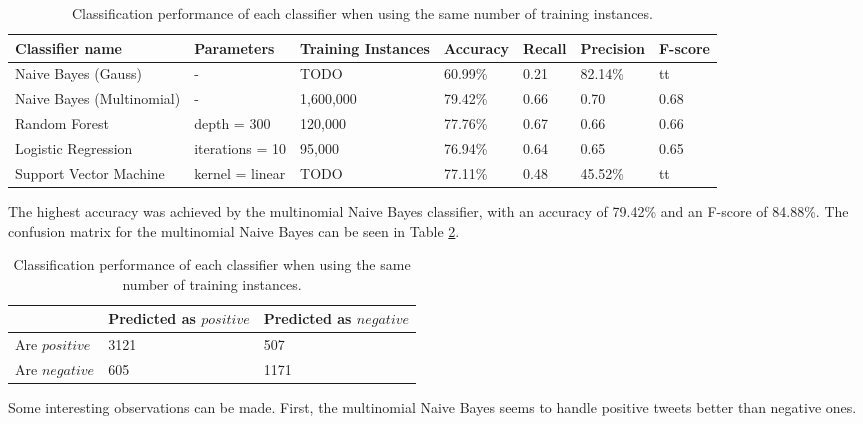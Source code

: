 \begin{table}[]
\centering
\caption{Classification performance of each classifier when using the same number of training instances.}
\begin{tabular}{ |p{3cm}||p{3cm}|p{2cm}|p{1.5cm}|p{1.5cm}|p{1.5cm}|p{1.5cm}| }
 \hline
 Classifier name &          Parameters &             Training Instances &    Accuracy &      Recall &     Precision& F-score \\
 \hline
 Naive Bayes (Gauss)        &-&            TODO&                 60.99\%&        0.21&       82.14\%& tt\\
  \hline
 Naive Bayes (Multinomial)  &-&                     1,600,000&                79.42\%&        0.66&       0.70& 0.68\\
  \hline
 Random Forest              &depth = 300&            120,000&                 77.76\%&        0.67&       0.66& 0.66\\
  \hline
 Logistic Regression        &iterations = 10&            95,000&                 76.94\%&        0.64&       0.65& 0.65\\
  \hline
 Support Vector Machine     &kernel = linear&            TODO&                 77.11\%&        0.48&       45.52\%& tt\\
 \hline
\end{tabular}
\label{tab:evaluations_euqal}
\end{table}

The highest accuracy was achieved by the multinomial Naive Bayes classifier, with an accuracy of 79.42\% and an F-score of 84.88\%. The confusion matrix for the multinomial Naive Bayes can be seen in Table \ref{tab:evaluations_conf}.
\begin{table}[]
\centering
\caption{Classification performance of each classifier when using the same number of training instances.}
\begin{tabular}{ |p{3cm}||p{3cm}|p{3cm}| }
 \hline
  &          Predicted as $positive$ &Predicted as $negative$  \\
 \hline
 Are $positive$        & 3121&            507\\
  \hline
 Are $negative$  &605&                     1171\\
 \hline

\end{tabular}
\label{tab:evaluations_conf}
\end{table}


Some interesting observations can be made. First, the multinomial Naive Bayes seems to handle positive tweets better than negative ones. 


